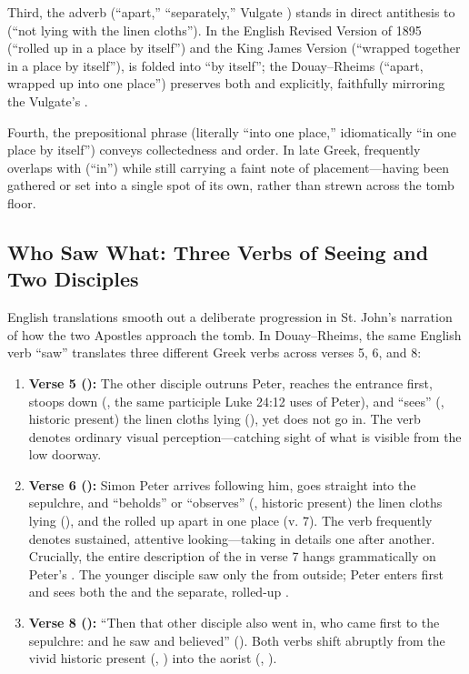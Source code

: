 Third, the adverb  (``apart,'' ``separately,'' Vulgate ) stands in direct antithesis to  (``not lying with the linen cloths''). In the English Revised Version of 1895 (``rolled up in a place by itself'') and the King James Version (``wrapped together in a place by itself''),  is folded into ``by itself''; the Douay--Rheims (``apart, wrapped up into one place'') preserves both  and  explicitly, faithfully mirroring the Vulgate's .

Fourth, the prepositional phrase  (literally ``into one place,'' idiomatically ``in one place by itself'') conveys collectedness and order. In late Greek,  frequently overlaps with  (``in'') while still carrying a faint note of placement---having been gathered or set into a single spot of its own, rather than strewn across the tomb floor.

\subsection{Who Saw What: Three Verbs of Seeing and Two Disciples}

English translations smooth out a deliberate progression in St. John's narration of how the two Apostles approach the tomb. In Douay--Rheims, the same English verb ``saw'' translates three different Greek verbs across verses 5, 6, and 8:

\begin{enumerate}
\item \textbf{Verse 5 ():} The other disciple outruns Peter, reaches the entrance first, stoops down (, the same participle Luke 24:12 uses of Peter), and ``sees'' (, historic present) the linen cloths lying (), yet does not go in. The verb  denotes ordinary visual perception---catching sight of what is visible from the low doorway.
\item \textbf{Verse 6 ():} Simon Peter arrives following him, goes straight into the sepulchre, and ``beholds'' or ``observes'' (, historic present) the linen cloths lying (), and the  rolled up apart in one place (v. 7). The verb  frequently denotes sustained, attentive looking---taking in details one after another. Crucially, the entire description of the  in verse 7 hangs grammatically on Peter's . The younger disciple saw only the  from outside; Peter enters first and sees both the  and the separate, rolled-up .
\item \textbf{Verse 8 ():} ``Then that other disciple also went in, who came first to the sepulchre: and he saw and believed'' (). Both verbs shift abruptly from the vivid historic present (, ) into the aorist (, ).
\end{enumerate}


